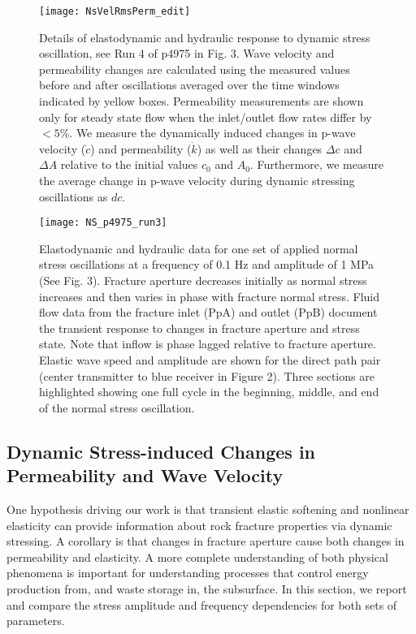 \documentclass[draft]{agujournal2019}
\begin{document}
\begin{figure*}[ht]
	\centering
	\texttt{[image: NsVelRmsPerm\_edit]}
	\caption[]{Details of elastodynamic and hydraulic response to dynamic stress oscillation, see Run 4 of p4975 in Fig. 3. Wave velocity and permeability changes are calculated using the measured values before and after oscillations averaged over the time windows indicated by yellow boxes. Permeability measurements are shown only for steady state flow when the inlet/outlet flow rates differ by $ < 5 \% $. We measure the dynamically induced changes in p-wave velocity ($ \dot c$) and permeability ($\dot k$) as well as their changes $\Delta c$ and $\Delta A$ relative to the initial values $c_0$ and $A_0$. Furthermore, we measure the average change in p-wave velocity during dynamic stressing oscillations as $ dc $.}
	\label{fig:delc_delk_calc}
\end{figure*}

\begin{figure*}[ht]
	\centering
	\texttt{[image: NS\_p4975\_run3]}
	\caption[]{Elastodynamic and hydraulic data for one set of applied normal stress oscillations at a frequency of 0.1 Hz and amplitude of 1 MPa (See Fig. 3). Fracture aperture decreases initially as normal stress increases and then varies in phase with fracture normal stress. Fluid flow data from the fracture inlet (PpA) and outlet (PpB) document the transient response to changes in fracture aperture and stress state. Note that inflow is phase lagged relative to fracture aperture. Elastic wave speed and amplitude are shown for the direct path pair (center transmitter to blue receiver in Figure 2). Three sections are highlighted showing one full cycle in the beginning, middle, and end of the normal stress oscillation. }
	\label{fig:NS_p4975_run3b_01Hz}
\end{figure*}


\subsection{Dynamic Stress-induced Changes in Permeability and Wave Velocity}

One hypothesis driving our work is that transient elastic softening and nonlinear elasticity can provide information about rock fracture properties via dynamic stressing. A corollary is that changes in fracture aperture cause both changes in permeability and elasticity. A more complete understanding of both physical phenomena is important for understanding processes that control energy production from, and waste storage in, the subsurface. In this section, we report and compare the stress amplitude and frequency dependencies for both sets of parameters. 
\end{document}

